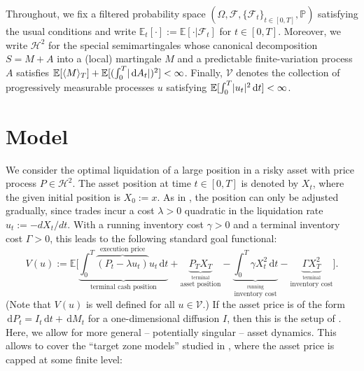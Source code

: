 \documentclass[11pt]{article}
\theoremstyle{definition}
\theoremstyle{remark}
\newcommand{\E}{\mathbb{E}} %
\renewcommand{\P}{\mathbb{P}} %
\newcommand{\F}{\mathcal{F}} %
\DeclarePairedDelimiter{\abs}{\lvert}{\rvert} %
\newcommand{\de}{\,\mathrm{d}}
\begin{document}
Throughout, we fix a filtered probability space $(\Omega, \F, \{\F_t\}_{t\in[0,T]}, \P)$ satisfying the usual conditions and write $\E_t[\cdot] := \E[\cdot \vert \F_t]$ for $t\in[0,T]$.
Moreover, we write $\mathcal{H}^2$ for the special semimartingales whose canonical decomposition $S=M+A$ into a (local) martingale $M$ and a predictable finite-variation process $A$ satisfies $\E[\langle M\rangle_T] + \E[(\int_0^T \abs{\de A_t})^2] < \infty$. Finally, $\mathcal{V}$ denotes the collection of progressively measurable processes $u$ satisfying $\E[\int_0^T \abs{u_t}^2 \de t] < \infty$.


\section{Model}\label{s:model}

We consider the optimal liquidation of a large position in a risky asset with price process $P \in \mathcal{H}^2$. The asset position at time $t \in [0,T]$ is denoted by $X_t$, where the given initial position is $X_0:=x$. As in \cite{almgren2001optimal}, the position can only be adjusted gradually, since trades incur a cost $\lambda>0$ quadratic in the liquidation rate $u_t := -dX_t/dt$. With a running inventory cost $\gamma>0$ and a terminal inventory cost $\Gamma>0$, this leads to the following standard goal functional:
\begin{equation}\label{eq:goal}
 V(u):= \E\Bigg[\underbrace{\int_0^T \overbrace{(P_t - \lambda u_t)}^{\textrm{execution price}} u_t \de t}_{\textrm{terminal cash position}} + \underbrace{P_T X_T}_{\stackrel{\textrm{terminal}}{\textrm{asset position}}} - \underbrace{\int_0^T \gamma X_t^2 \de t}_{\stackrel{\textrm{running}}{\textrm{inventory cost}}} - \underbrace{\Gamma X_T^2}_{\stackrel{\textrm{terminal}}{\textrm{inventory cost}}} \Bigg].
\end{equation}
(Note that $V(u)$ is well defined for all $u\in\mathcal V$.)
If the asset price is of the form $\de P_t = I_t \de t + \de M_t$ for a one-dimensional diffusion $I$, then this is the setup of \cite{lehalle2017incorporating}. Here, we allow for more general -- potentially singular -- asset dynamics. This allows to cover the ``target zone models'' studied in \cite{neuman.schied.16}, where the asset price is capped at some finite level:
\end{document}
